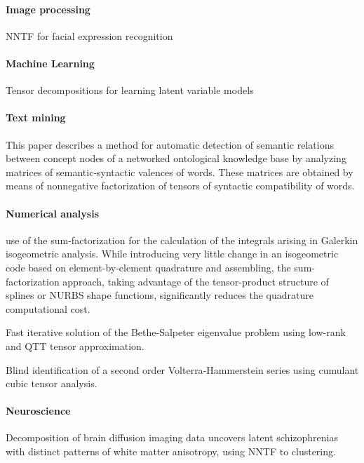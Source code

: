 \documentclass[letterpaper,12pt]{article}
\begin{document}
\paragraph{Image processing}

\cite{An2015} NNTF for facial expression recognition


\paragraph{Machine Learning}

\cite{Anandkumar2012} Tensor decompositions for learning latent variable models

\paragraph{Text mining}

\cite{Anisimov2014} This paper describes a method for automatic detection of semantic relations between concept nodes of a networked ontological knowledge base by analyzing matrices of semantic-syntactic valences of words. These matrices are obtained by means of nonnegative factorization of tensors of syntactic compatibility of words. 


\paragraph{Numerical analysis}
 
\cite{Antolin2015} use of the sum-factorization for the calculation of the integrals arising in Galerkin isogeometric analysis. While introducing very little change in an isogeometric code based on element-by-element quadrature and assembling, the sum-factorization approach, taking advantage of the tensor-product structure of splines or NURBS shape functions, significantly reduces the quadrature computational cost.

\cite{Benner2016} Fast iterative solution of the Bethe-Salpeter eigenvalue problem using low-rank and QTT tensor approximation.


\cite{Cherif2008} Blind identification of a second order Volterra-Hammerstein series using cumulant cubic tensor analysis.

\paragraph{Neuroscience}

\cite{Arnedo2015} Decomposition of brain diffusion imaging data uncovers latent schizophrenias with distinct patterns of white matter anisotropy, using NNTF to clustering.
\end{document}
